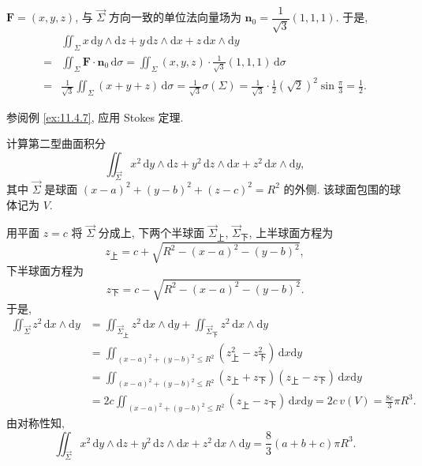 \begin{solution}[解法 2]
$\boldsymbol{F}=(x,y,z)$, 与 $\vec{\Sigma}$ 方向一致的单位法向量场为 $\boldsymbol{n}_{0}=\dfrac{1}{\sqrt{3}}(1,1,1)$. 于是,
\[
\begin{aligned}
&\iint_{\Sigma}x\,\mathrm{d}y\wedge\mathrm{d}z+y\,\mathrm{d}z\wedge\mathrm{d}x+z\,\mathrm{d}x\wedge\mathrm{d}y\\
={}&\iint_{\Sigma}\boldsymbol{F}\cdot\boldsymbol{n}_{0}\,\mathrm{d}\sigma=\iint_{\Sigma}(x,y,z)\cdot\frac{1}{\sqrt{3}}(1,1,1)\,\mathrm{d}\sigma\\
={}&\frac{1}{\sqrt{3}}\iint_{\Sigma}(x+y+z)\,\mathrm{d}\sigma=\frac{1}{\sqrt{3}}\sigma(\Sigma)=\frac{1}{\sqrt{3}}\cdot\frac{1}{2}(\sqrt{2})^{2}\sin\frac{\pi}{3}=\frac{1}{2}.
\end{aligned}
\]
\end{solution}
\begin{solution}[解法 3]
参阅例 \ref{ex:11.4.7}, 应用 Stokes 定理.
\end{solution}

\begin{example}\label{ex:11.3.12}
计算第二型曲面积分
\[
\iint_{\overrightarrow{\Sigma}}x^{2}\,\mathrm{d}y\wedge\mathrm{d}z+y^{2}\,\mathrm{d}z\wedge\mathrm{d}x+z^{2}\,\mathrm{d}x\wedge\mathrm{d}y,
\]
其中 $\overrightarrow{\Sigma}$ 是球面 $(x-a)^{2}+(y-b)^{2}+(z-c)^{2}=R^{2}$ 的外侧. 该球面包围的球体记为 $V$.
\end{example}
\begin{solution}
用平面 $z=c$ 将 $\overrightarrow{\Sigma}$ 分成上, 下两个半球面 $\overrightarrow{\Sigma}_{\text{上}}$, $\overrightarrow{\Sigma}_{\text{下}}$, 上半球面方程为
\[
z_{\text{上}}=c+\sqrt{R^{2}-(x-a)^{2}-(y-b)^{2}},
\]
下半球面方程为
\[
z_{\text{下}}=c-\sqrt{R^{2}-(x-a)^{2}-(y-b)^{2}}.
\]
于是,
\[
\begin{aligned}
\iint_{\overrightarrow{\Sigma}}z^{2}\,\mathrm{d}x\wedge\mathrm{d}y&=\iint_{\overrightarrow{\Sigma}_{\text{上}}}z^{2}\,\mathrm{d}x\wedge\mathrm{d}y+\iint_{\overrightarrow{\Sigma}_{\text{下}}}z^{2}\,\mathrm{d}x\wedge\mathrm{d}y\\
&=\iint_{(x-a)^{2}+(y-b)^{2}\leqslant R^{2}}(z_{\text{上}}^{2}-z_{\text{下}}^{2})\,\mathrm{d}x\mathrm{d}y\\
&=\iint_{(x-a)^{2}+(y-b)^{2}\leqslant R^{2}}(z_{\text{上}}+z_{\text{下}})(z_{\text{上}}-z_{\text{下}})\,\mathrm{d}x\mathrm{d}y\\
&=2c\iint_{(x-a)^{2}+(y-b)^{2}\leqslant R^{2}}(z_{\text{上}}-z_{\text{下}})\,\mathrm{d}x\mathrm{d}y=2c\,v(V)=\frac{8c}{3}\pi R^{3}.
\end{aligned}
\]
由对称性知,
\[
\iint_{\overrightarrow{\Sigma}}x^{2}\,\mathrm{d}y\wedge\mathrm{d}z+y^{2}\,\mathrm{d}z\wedge\mathrm{d}x+z^{2}\,\mathrm{d}x\wedge\mathrm{d}y=\frac{8}{3}(a+b+c)\pi R^{3}.
\]
\end{solution}

